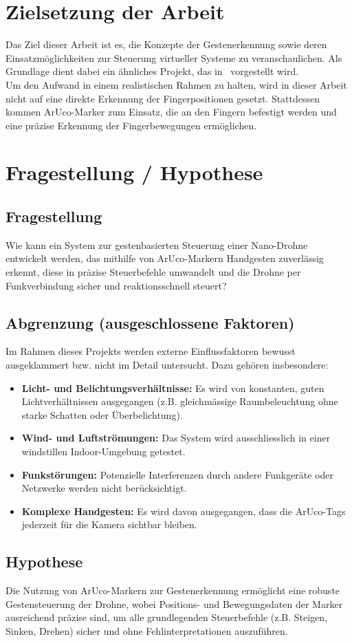\section{Zielsetzung der Arbeit}
Das Ziel dieser Arbeit ist es, die Konzepte der Gestenerkennung sowie deren Einsatzmöglichkeiten zur Steuerung virtueller Systeme zu veranschaulichen.
Als Grundlage dient dabei ein ähnliches Projekt, das in~\cite{arxiv:OmniRace} vorgestellt wird.\\[2pt]
Um den Aufwand in einem realistischen Rahmen zu halten, wird in dieser Arbeit nicht auf eine direkte Erkennung der Fingerpositionen gesetzt.
Stattdessen kommen ArUco-Marker zum Einsatz, die an den Fingern befestigt werden und eine präzise Erkennung der Fingerbewegungen ermöglichen.

\section{Fragestellung / Hypothese}
\subsection{Fragestellung}
Wie kann ein System zur gestenbasierten Steuerung einer Nano-Drohne entwickelt werden, das mithilfe von ArUco-Markern Handgesten zuverlässig erkennt, diese in präzise Steuerbefehle umwandelt und die Drohne per  Funkverbindung sicher und reaktionsschnell steuert?

\subsection{Abgrenzung (ausgeschlossene Faktoren)}
Im Rahmen dieses Projekts werden externe Einflussfaktoren bewusst ausgeklammert bzw. nicht im Detail untersucht.
Dazu gehören insbesondere:
\begin{itemize}
  \item \textbf{Licht- und Belichtungsverhältnisse:} Es wird von konstanten, guten Lichtverhältnissen ausgegangen (z.B. gleichmässige Raumbeleuchtung ohne starke Schatten oder Überbelichtung).
  \item \textbf{Wind- und Luftströmungen:} Das System wird ausschliesslich in einer windstillen Indoor-Umgebung getestet.
  \item \textbf{Funkstörungen:} Potenzielle Interferenzen durch andere Funkgeräte oder Netzwerke werden nicht berücksichtigt.
  \item \textbf{Komplexe Handgesten:} Es wird davon ausgegangen, dass die ArUco-Tags jederzeit für die Kamera sichtbar bleiben.
\end{itemize}

\subsection{Hypothese}
Die Nutzung von ArUco-Markern zur Gestenerkennung ermöglicht eine robuste Gestensteuerung der Drohne, wobei Positions- und Bewegungsdaten der Marker ausreichend präzise sind, um alle grundlegenden Steuerbefehle (z.B. Steigen, Sinken, Drehen) sicher und ohne Fehlinterpretationen auszuführen.

\endgroup